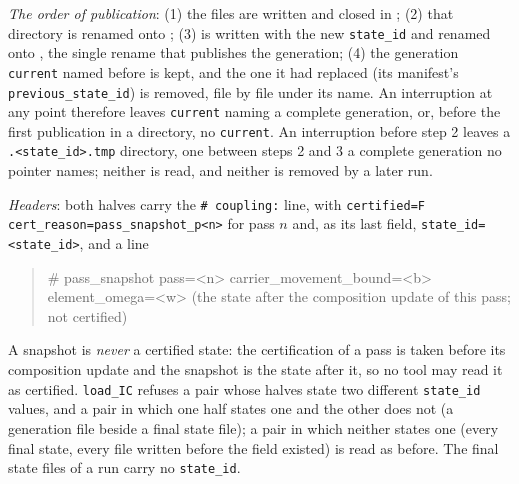 \documentclass[english,a4paper]{my_memo}
\begin{document}
\emph{The order of publication}: (1) the files are written and closed in
; (2) that directory is renamed onto
; (3) 
is written with the new \texttt{state\_id} and renamed onto
, the single rename that publishes the
generation; (4) the generation \texttt{current} named before is kept, and the
one it had replaced (its manifest's \texttt{previous\_state\_id}) is removed,
file by file under its name. An interruption at any point therefore leaves
\texttt{current} naming a complete generation, or, before the first
publication in a directory, no \texttt{current}. An interruption before step 2
leaves a \texttt{.<state\_id>.tmp} directory, one between steps 2 and 3 a
complete generation no pointer names; neither is read, and neither is removed
by a later run.

\emph{Headers}: both halves carry the \texttt{\# coupling:} line, with
\texttt{certified=F cert\_reason=pass\_snapshot\_p<n>} for pass $n$ and, as
its last field, \texttt{state\_id=<state\_id>}, and a line
\begin{quote}\ttfamily\small
\# pass\_snapshot pass=<n> carrier\_movement\_bound=<b> element\_omega=<w>
(the state after the composition update of this pass; not certified)
\end{quote}
A snapshot is \emph{never} a certified state: the certification of a pass is
taken before its composition update and the snapshot is the state after it,
so no tool may read it as certified. \texttt{load\_IC} refuses a pair whose
halves state two different \texttt{state\_id} values, and a pair in which one
half states one and the other does not (a generation file beside a final state
file); a pair in which neither states one (every final state, every file
written before the field existed) is read as before. The final state files of
a run carry no \texttt{state\_id}.
\end{document}
